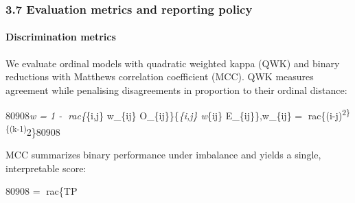 \subsubsection{3.7 Evaluation metrics and reporting policy}\label{evaluation-metrics-and-reporting-policy}

\paragraph{Discrimination metrics}\label{discrimination-metrics}

We evaluate ordinal models with quadratic weighted kappa (QWK) and binary reductions with Matthews correlation coefficient (MCC). QWK measures agreement while penalising disagreements in proportion to their ordinal distance:

80908\kappa\emph{w = 1 - rac\{\sum}\{i,j\} w\_\{ij\} O\_\{ij\}\}\{\sum\emph{\{i,j\} w}\{ij\} E\_\{ij\}\},\quad w\_\{ij\} = rac\{(i-j)\textsuperscript{2\}\{(k-1)}2\}80908

MCC summarizes binary performance under imbalance and yields a single, interpretable score:

80908 = rac\{TP
